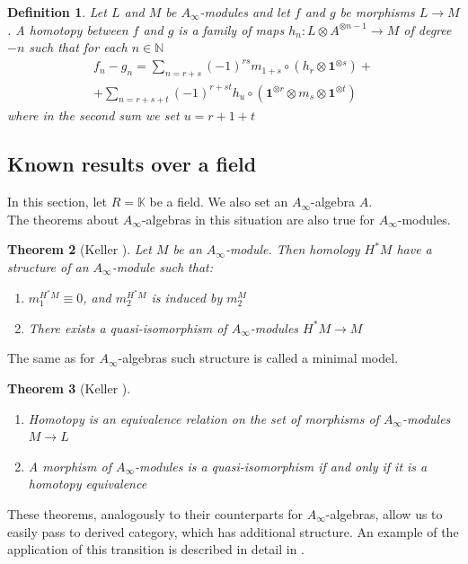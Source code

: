 \documentclass[a4paper, 12pt, openany, fleqn]{amsart}
\newtheorem{theorem}{Theorem}[section]
\newtheorem{definition}[theorem]{Definition}
\begin{document}
\begin{definition}
    Let $L$ and $M$ be $A_\infty$-modules and let $f$ and $g$ be  morphisms $L\longrightarrow M$. A homotopy between $f$ and $g$ is a family of maps $h_n:L\otimes A^{\otimes n-1}\longrightarrow M$ of degree $-n$ such that for each $n\in\mathbb{N}$
    \begin{align*}
        f_n - g_n = \sum_{n=r+s} (-1)^{rs}m_{1+s}\circ(h_r\otimes\mathbf{1}^{\otimes s}) +\\ + \sum_{n=r+s+t} (-1)^{r+st} h_u\circ(\mathbf{1}^{\otimes r}\otimes m_s\otimes\mathbf{1}^{\otimes t})
    \end{align*}
    where in the second sum we set $u=r+1+t$
\end{definition}
\subsection{Known results over a field}
In this section, let $R=\mathbb{K}$ be a field. We also set an $A_\infty$-algebra $A$.\\
The theorems about $A_\infty$-algebras in this situation are also true for $A_\infty$-modules.
\begin{theorem}[Keller \cite{MR1854636}]
    Let $M$ be an $A_\infty$-module. Then homology $H^*M$ have a structure of an $A_\infty$-module such that:
    \begin{enumerate}
        \item $m_1^{H^*M}\equiv0$, and $m_2^{H^*M}$ is induced by $m_2^M$
        \item There exists a quasi-isomorphism of $A_\infty$-modules $H^*M\longrightarrow M$
    \end{enumerate}
\end{theorem}
The same as for $A_\infty$-algebras such structure is called a minimal model.
\begin{theorem}[Keller \cite{MR1854636}]
    \begin{enumerate}
        \item Homotopy is an equivalence relation on the set of morphisms of $A_\infty$-modules $M\longrightarrow L$
        \item A morphism of $A_\infty$-modules is a quasi-isomorphism if and only if it is a homotopy equivalence
    \end{enumerate}
\end{theorem}
These theorems, analogously to their counterparts for $A_\infty$-algebras, allow us to easily pass to derived category, which has additional structure. An example of the application of this transition is described in detail in \cite{MR1854636}.
\end{document}
